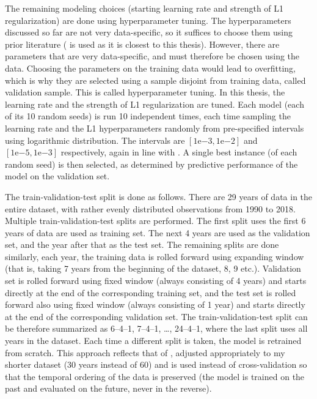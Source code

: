 		The remaining modeling choices (starting learning rate and strength of L1 regularization) are done using hyperparameter tuning. The hyperparameters discussed so far are not very data-specific, so it suffices to choose them using prior literature (\cite{gu2020empirical} is used as it is closest to this thesis). However, there are parameters that are very data-specific, and must therefore be chosen using the data. Choosing the parameters on the training data would lead to overfitting, which is why they are selected using a sample disjoint from training data, called validation sample. This is called hyperparameter tuning. In this thesis, the learning rate and the strength of L1 regularization are tuned. Each model (each of its 10 random seeds) is run 10 independent times, each time sampling the learning rate and the L1 hyperparameters randomly from pre-specified intervals using logarithmic distribution. The intervals are $\left[1\mathrm{e}{-3}, 1\mathrm{e}{-2}\right]$ and $\left[1\mathrm{e}{-5}, 1\mathrm{e}{-3}\right]$ respectively, again in line with \cite{gu2020empirical}. A single best instance (of each random seed) is then selected, as determined by predictive performance of the model on the validation set.
		
		The train-validation-test split is done as follows. There are 29 years of data in the entire dataset, with rather evenly distributed observations from 1990 to 2018. Multiple train-validation-test splits are performed. The first split uses the first 6 years of data are used as training set. The next 4 years are used as the validation set, and the year after that as the test set. The remaining splits are done similarly, each year, the training data is rolled forward using expanding window (that is, taking 7 years from the beginning of the dataset, 8, 9 etc.). Validation set is rolled forward using fixed window (always consisting of 4 years) and starts directly at the end of the corresponding training set, and the test set is rolled forward also using fixed window (always consisting of 1 year) and starts directly at the end of the corresponding validation set. The train-validation-test split can be therefore summarized as 6--4--1, 7--4--1, \ldots, 24--4--1,  where the last split uses all years in the dataset. Each time a different split is taken, the model is retrained from scratch. This approach reflects that of \cite{gu2020empirical}, adjusted appropriately to my shorter dataset (30 years instead of 60) and is used instead of cross-validation so that the temporal ordering of the data is preserved (the model is trained on the past and evaluated on the future, never in the reverse).    
	
